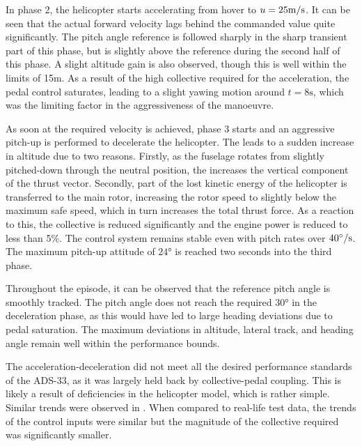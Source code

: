 In phase 2, the helicopter starts accelerating from hover to $u=25\si[per-mode=symbol]{\meter \per \second}$. It can be seen that the actual forward velocity lags behind the commanded value quite significantly. The pitch angle reference is followed sharply in the sharp transient part of this phase, but is slightly above the reference during the second half of this phase. A slight altitude gain is also observed, though this is well within the limits of 15m. As a result of the high collective required for the acceleration, the pedal control saturates, leading to a slight yawing motion around $t = 8 \si{\second}$, which was the limiting factor in the aggressiveness of the manoeuvre. 

As soon at the required velocity is achieved, phase 3 starts and an aggressive pitch-up is performed to decelerate the helicopter. The leads to a sudden increase in altitude due to two reasons. Firstly, as the fuselage rotates from slightly pitched-down through the neutral position, the increases the vertical component of the thrust vector. Secondly, part of the lost kinetic energy of the helicopter is transferred to the main rotor, increasing the rotor speed to slightly below the maximum safe speed, which in turn increases the total thrust force. As a reaction to this, the collective is reduced significantly and the engine power is reduced to less than 5\%. The control system remains stable even with pitch rates over $40\si[per-mode=symbol]{\degree \per \second}$. The maximum pitch-up attitude of $24\si{\degree}$ is reached two seconds into the third phase. 

Throughout the episode, it can be observed that the reference pitch angle is smoothly tracked. The pitch angle does not reach the required $30\si{\degree}$ in the deceleration phase, as this would have led to large heading deviations due to pedal saturation. The maximum deviations in altitude, lateral track, and heading angle remain well within the performance bounds. 

The acceleration-deceleration did not meet all the desired performance standards of the ADS-33, as it was largely held back by collective-pedal coupling. This is likely a result of deficiencies in the helicopter model, which is rather simple. Similar trends were observed in \cite{VanDerVorst1998}. When compared to real-life test data, the trends of the control inputs were similar but the magnitude of the collective required was significantly smaller. 

